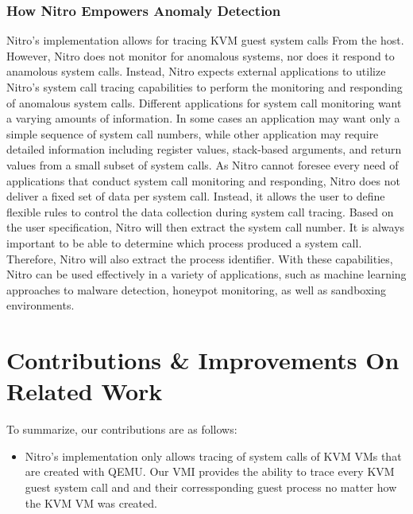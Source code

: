 \documentclass{report}
\begin{document}
\begin{spacing}{1.5}
\subsubsection{How Nitro Empowers Anomaly Detection}

{\large
Nitro's implementation allows for tracing KVM guest system calls From the host. However, Nitro does not monitor for anomalous systems, nor does it respond to anamolous system calls. Instead, Nitro expects external applications to utilize Nitro's system call tracing capabilities to perform the monitoring and responding of anomalous system calls. Different applications for system call monitoring want a varying amounts of information. In some cases an application may want only a simple sequence of system call numbers, while other application may require detailed information including register values, stack-based arguments, and return values from a small subset of system calls. As Nitro cannot foresee every need of applications that conduct system call monitoring and responding, Nitro does not deliver a fixed set of data per system call. Instead, it allows the user to define flexible rules to control the data collection during system call tracing. Based on the user specification, Nitro will then extract the system call number. It is always important to be able to determine which process produced a system call. Therefore, Nitro will also extract the process identifier. With these capabilities, Nitro can be used effectively in a variety of applications, such as machine learning approaches to malware detection, honeypot monitoring, as well as sandboxing environments.
\newline
}














\section{Contributions \& Improvements On Related Work}

{\large
To summarize, our contributions are as follows:

\begin{itemize}
  \item Nitro's implementation only allows tracing of system calls of KVM VMs that are created with QEMU. Our VMI provides the ability to trace every KVM guest system call and and their corressponding guest process no matter how the KVM VM was created.
  

\end{itemize}}
\end{spacing}
\end{document}
